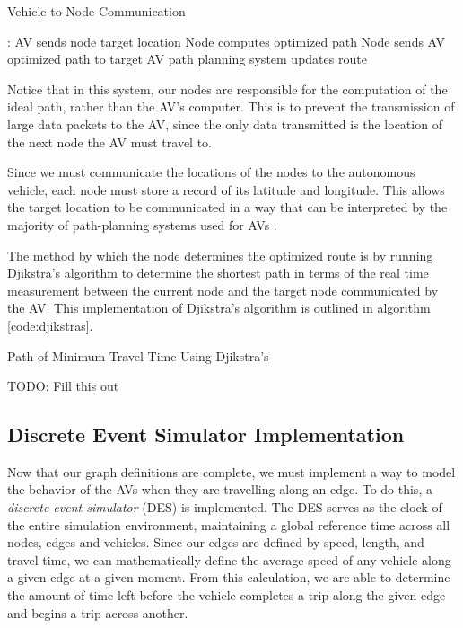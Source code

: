\documentclass[conference]{IEEEtran}
\begin{document}
\begin{algorithm}
	\caption{Vehicle-to-Node Communication}\label{code:vtn-comm}
	\begin{algorithmic}[1]
	    :
	        \State AV sends node target location
	        \State Node computes optimized path
	        \State Node sends AV optimized path to target
	        \State AV path planning system updates route
	    \EndIf
	\end{algorithmic} 
\end{algorithm}

Notice that in this system, our nodes are responsible for the computation of the ideal path, rather than the AV's computer. This is to prevent the transmission of large data packets to the AV, since the only data transmitted is the location of the next node the AV must travel to.

Since we must communicate the locations of the nodes to the autonomous vehicle, each node must store a record of its latitude and longitude. This allows the target location to be communicated in a way that can be interpreted by the majority of path-planning systems used for AVs \cite{pathplanning}.

The method by which the node determines the optimized route is by running Djikstra's algorithm \cite{clrs} to determine the shortest path in terms of the real time measurement between the current node and the target node communicated by the AV. This implementation of Djikstra's algorithm is outlined in algorithm \ref{code:djikstras}. 

\begin{algorithm}
	\caption{Path of Minimum Travel Time Using Djikstra's}\label{code:djikstras}
	\begin{algorithmic}[1]
	    \State TODO: Fill this out
	\end{algorithmic} 
\end{algorithm}

\subsection{Discrete Event Simulator Implementation}

Now that our graph definitions are complete, we must implement a way to model the behavior of the AVs when they are travelling along an edge. To do this, a \textit{discrete event simulator} (DES) is implemented. The DES serves as the clock of the entire simulation environment, maintaining a global reference time across all nodes, edges and vehicles. Since our edges are defined by speed, length, and travel time, we can mathematically define the average speed of any vehicle along a given edge at a given moment. From this calculation, we are able to determine the amount of time left before the vehicle completes a trip along the given edge and begins a trip across another. 
\end{document}
